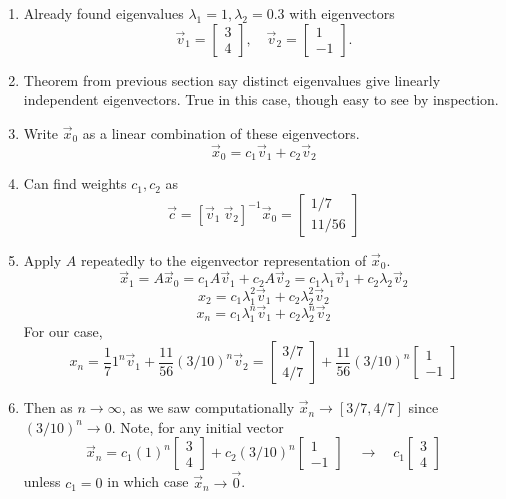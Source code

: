 \documentclass{article}
\begin{document}
\begin{enumerate}
\begin{enumerate}
\item Already found eigenvalues $\lambda_1 = 1, \lambda_2 = 0.3$ with eigenvectors 
\[
\vec{v}_1 = \left[ 
\begin{array}{c}
3 \\ 4 
\end{array} \right], \quad
\vec{v}_2 = \left[ 
\begin{array}{c}
1 \\ -1 
\end{array} \right].
\]

\item Theorem from previous section say distinct eigenvalues give linearly independent eigenvectors. True in this case, though easy to see by inspection.

\item Write $\vec{x}_0$ as a linear combination of these eigenvectors.
\[
\vec{x}_0 = c_1 \vec{v}_1 + c_2 \vec{v}_2
\]

\item Can find weights $c_1, c_2$ as
\[
\vec{c} = \left[\vec{v}_1 ~\vec{v}_2 \right]^{-1} \vec{x}_0 = \left[
\begin{array}{c}
1/7 \\ 11/56
\end{array}
\right]
\]

\item Apply $A$ repeatedly to the eigenvector representation of $\vec{x}_0$.
\[
\vec{x}_1 = A\vec{x}_0 = c_1 A \vec{v}_1 + c_2 A \vec{v}_2 = c_1 \lambda_1 \vec{v}_1 + c_2 \lambda_2 \vec{v}_2
\]
\[
x_2 = c_1 \lambda_1^2 \vec{v}_1 + c_2 \lambda_2^2 \vec{v}_2
\]
\[
x_{n} = c_1 \lambda_1^n \vec{v}_1 + c_2 \lambda_2^n \vec{v}_2
\]
For our case,
\[
x_{n} = \frac{1}{7} 1^n \vec{v}_1 + \frac{11}{56} (3/10)^n \vec{v}_2
= \left[
\begin{array}{c}
3/7 \\ 4/7
\end{array}
\right] + \frac{11}{56} (3/10)^n \left[
\begin{array}{c}
1 \\ -1
\end{array}
\right]
\]

\item Then as $n \rightarrow \infty$, as we saw computationally $\vec{x}_n \rightarrow [3/7, 4/7]$ since $(3/10)^n \rightarrow 0$. Note, for any initial vector
\[
\vec{x}_n = c_1(1)^n \left[
\begin{array}{c}
3 \\4
\end{array}
\right] +
c_2 (3/10)^n \left[
\begin{array}{c}
1 \\ -1
\end{array}\right] \quad \rightarrow \quad
c_1 \left[
\begin{array}{c}
3 \\ 4
\end{array}
\right]
\] 
unless $c_1 =0$ in which case $\vec{x}_n \rightarrow \vec{0}$. 


\end{enumerate}
\end{enumerate}
\end{document}

